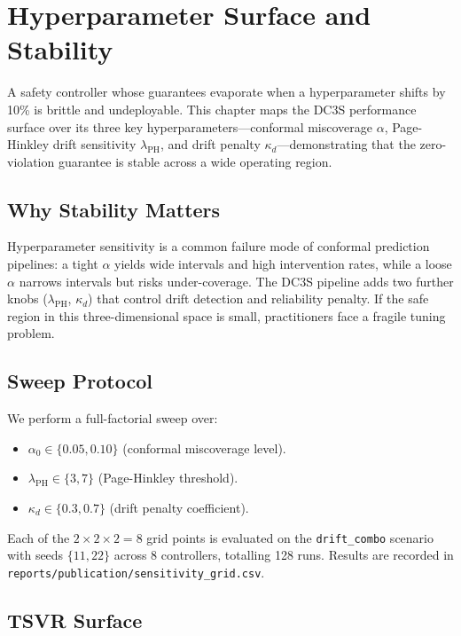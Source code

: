 
\chapter{Hyperparameter Surface and Stability}
\label{ch:hyperparameter}

A safety controller whose guarantees evaporate when a hyperparameter
shifts by 10\% is brittle and undeployable.  This chapter maps the
DC3S performance surface over its three key hyperparameters---conformal
miscoverage $\alpha$, Page-Hinkley drift sensitivity $\lambda_{\mathrm{PH}}$,
and drift penalty $\kappa_d$---demonstrating that the zero-violation
guarantee is stable across a wide operating region.

\section{Why Stability Matters}

Hyperparameter sensitivity is a common failure mode of conformal
prediction pipelines: a tight $\alpha$ yields wide intervals and high
intervention rates, while a loose $\alpha$ narrows intervals but risks
under-coverage.  The DC3S pipeline adds two further knobs
($\lambda_{\mathrm{PH}}$, $\kappa_d$) that control drift detection and
reliability penalty.  If the safe region in this three-dimensional space
is small, practitioners face a fragile tuning problem.

\section{Sweep Protocol}

We perform a full-factorial sweep over:
\begin{itemize}
  \item $\alpha_0 \in \{0.05, 0.10\}$ (conformal miscoverage level).
  \item $\lambda_{\mathrm{PH}} \in \{3, 7\}$ (Page-Hinkley threshold).
  \item $\kappa_d \in \{0.3, 0.7\}$ (drift penalty coefficient).
\end{itemize}

Each of the $2 \times 2 \times 2 = 8$ grid points is evaluated on the
\texttt{drift\_combo} scenario with seeds $\{11, 22\}$ across 8
controllers, totalling 128 runs.  Results are recorded in
\texttt{reports/publication/sensitivity\_grid.csv}.

\section{TSVR Surface}

